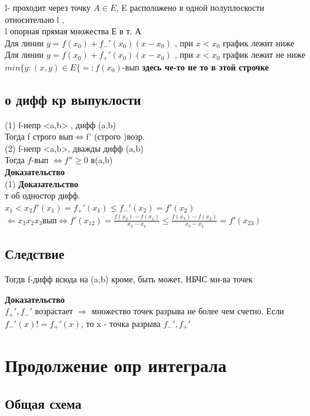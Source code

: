 \documentclass[12pt, a4paper]{article}
\begin{document}
	
	l- проходит через точку $A \in E$, E расположено в одной полуплоскости относительно l ,\\
	l опорная прямая множества Е в т. А\\
	Для линии $y=f(x_0)+f_-'(x_0)(x-x_0)$ , при $x<x_0$ график лежит ниже  \\
	Для линии $y=f(x_0)+f_+'(x_0)(x-x_0)$ , при $x<x_0$ график лежит не ниже \\
	$min\lbrace y:(x,y)\in E \lbrace =: f(x_0) $-вып \textbf{здесь че-то не то в этой строчке} \\
	\subsection{о дифф кр выпуклости}
	(1) f-непр <a,b> , дифф (a,b) \\
	Тогда  f  строго вып$ \Longleftrightarrow $f' (строго )возр. \\
	
	(2) f-непр <a,b>, дважды дифф (a,b) \\
	Тогда $f$-вып  $\Longleftrightarrow f'' \geq 0$ в(a,b) \\
	
	\textbf{Доказательство} \\
	(1)   \textbf{Доказательство} \\ т об одностор дифф. \\
	$ x_1<x_2 f'(x_1)=f_+'(x_1)\leq  f_-'(x_2)=f'(x_2)$ \\
	$ \Leftarrow x_1 x_2 x_3 вып \Longleftrightarrow   f'(x_{12})=\frac{f(x_2)-f(x_1)}{x_2-x_1} \leq  \frac{f(x_3)-f(x_2)}{x_3-x_2}=f'(x_{23})$ \\
	
	\subsection{Следствие}
	Тогдв f-дифф всюда на (a,b) кроме, быть может,  НБЧС  мн-ва точек
	
	\textbf{Доказательство} \\
	$f_+', f_-'$ возрастает $\Rightarrow$ множество точек разрыва не более чем счетно. Если $f_-'(x) != f_+'(x)$, то x - точка разрыва  $f_-',f_+'$ \\
	
	\section{Продолжение опр интеграла}
	
	\subsection{Общая схема}
	
\end{document}
